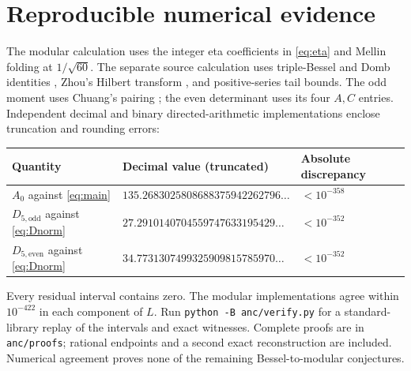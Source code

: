 \documentclass[11pt]{article}
\numberwithin{equation}{section}
\theoremstyle{definition}
\theoremstyle{remark}
\theoremstyle{plain}
\newcommand{\De}{D_{5,\mathrm{even}}}
\newcommand{\Do}{D_{5,\mathrm{odd}}}
\begin{document}
\section{Reproducible numerical evidence}
The modular calculation uses the integer eta coefficients in \eqref{eq:eta}
and Mellin folding at $1/\sqrt{60}$. The separate source calculation uses
triple-Bessel and Domb identities \cite{BBBG}, Zhou's Hilbert transform
\cite[eq.~(3.1)]{Zhou}, and positive-series tail bounds.
The odd moment uses Chuang's pairing \cite{Chu}; the even determinant uses its
four $A,C$ entries. Independent decimal and binary directed-arithmetic
implementations enclose truncation and rounding errors:
\begin{center}
\begin{tabular}{lll}
\toprule
Quantity & Decimal value (truncated) & Absolute discrepancy\\
\midrule
$A_0$ against \eqref{eq:main} & $135.2683025808688375942262796\ldots$ & $<10^{-358}$\\
$\Do$ against \eqref{eq:Dnorm} & $27.2910140704559747633195429\ldots$ & $<10^{-352}$\\
$\De$ against \eqref{eq:Dnorm} & $34.7731307499325909815785970\ldots$ & $<10^{-352}$\\
\bottomrule
\end{tabular}
\end{center}
Every residual interval contains zero. The modular implementations agree
within $10^{-422}$ in each component of $L$.
Run \texttt{python -B anc/verify.py} for a standard-library replay of the
intervals and exact witnesses. Complete proofs are in \texttt{anc/proofs};
rational endpoints and a second exact reconstruction are included. Numerical agreement proves none of the
remaining Bessel-to-modular conjectures.
\end{document}
